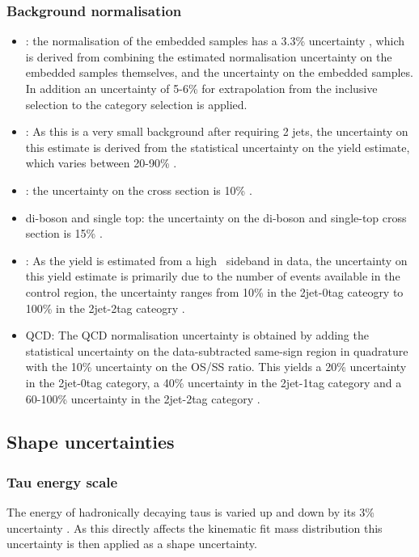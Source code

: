 \subsubsection*{Background normalisation}
\begin{itemize}
\item \Ztautau : the normalisation of the embedded samples has a 3.3\% uncertainty \cite{CMS-HIG-14-034}, which is derived
from combining the estimated normalisation uncertainty on the embedded samples themselves, and the uncertainty on the \ttbar embedded samples. In addition an uncertainty of 5-6\% for extrapolation from the inclusive selection to the category selection is applied.
\item \Zellell: As this is a very small background after requiring 2 jets, the uncertainty on this estimate is derived from the statistical uncertainty on the yield estimate, which varies between 20-90\% \cite{CMS-HIG-14-034}.
\item \ttbar: the uncertainty on the \ttbar cross section is 10\% \cite{SMHtautauCMS}.
\item di-boson and single top: the uncertainty on the di-boson and single-top cross section is 15\% \cite{SMHtautauCMS}.
\item \Wjets: As the \Wjets yield is estimated from a high \mT~sideband in data, the uncertainty on this yield estimate is primarily due to the number of events available in the control region, the uncertainty ranges from 10\% in the 2jet-0tag cateogry to 100\% in the 2jet-2tag cateogry \cite{CMS-HIG-14-034}.
\item QCD: The QCD normalisation uncertainty is obtained by adding the statistical uncertainty on the data-subtracted same-sign region in quadrature with the 10\% uncertainty on the OS/SS ratio. This yields a 20\% uncertainty in the 2jet-0tag category, a 40\% uncertainty in the 2jet-1tag category and a 60-100\% uncertainty in the 2jet-2tag category \cite{CMS-HIG-14-034}.
\end{itemize}
\subsection{Shape uncertainties}
\label{sec:hhh_uncerts_shape}
\subsubsection*{Tau energy scale}
The energy of hadronically decaying taus is varied up and down by its 3\% uncertainty \cite{SMHtautauCMS}. As this directly affects the kinematic fit mass distribution this uncertainty is then applied as a shape uncertainty.
